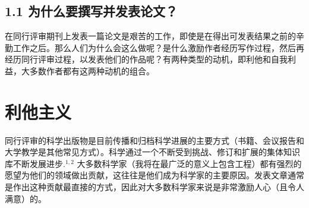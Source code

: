 \subsection*{1.1 为什么要撰写并发表论文？}
在同行评审期刊上发表一篇论文是艰苦的工作，即使是在得出可发表结果之前的辛勤工作之后。那么人们为什么会这么做呢？是什么激励作者经历写作过程，然后再经历同行评审过程，以发表他们的作品呢？有两种类型的动机，即利他和自我利益，大多数作者都有这两种动机的组合。

\section*{利他主义}
同行评审的科学出版物是目前传播和归档科学进展的主要方式（书籍、会议报告和大学教学是其他常见方式）。科学通过一个不断受到挑战、修订和扩展的集体知识库不断发展进步.${ }^{1,2}$ 大多数科学家（我将在最广泛的意义上包含工程）都有强烈的愿望为他们的领域做出贡献，这往往是他们成为科学家的主要原因。发表文章通常是作出这种贡献最直接的方式，因此对大多数科学家来说是非常激励人心（且令人满意）的。

